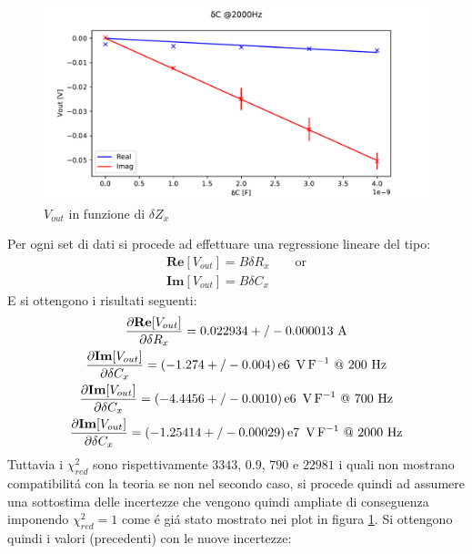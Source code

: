 \begin{figure}[h]
\begin{minipage}{0.5\textwidth}
    \end{minipage}\hfill
    \begin{minipage}{0.5\textwidth}
        \centering
        \includegraphics[width=\textwidth]{Figure_11.pdf} 
    \end{minipage}
    \caption{$V_{out}$ in funzione di $\delta Z_x$}
    \label{fig:deltaz}
\end{figure}
Per ogni set di dati si procede ad effettuare una regressione lineare del tipo:
\begin{gather}
	\mathbf{Re}[V_{out}]=B \delta R_x \qquad \text{or}\\
	\mathbf{Im}[V_{out}]=B \delta C_x
\end{gather}
E si ottengono i risultati seguenti:
\begin{gather}
	\frac{\partial \mathbf{Re}[V_{out}]}{\partial \delta R_x} = 0.022934+/-0.000013 \ \si{\ampere} \\
	\frac{\partial \mathbf{Im}[V_{out}]}{\partial \delta C_x} = (-1.274+/-0.004)\E{6} \ \si{\volt\per\farad} \ @ \  200 \ \si{\hertz}\\
	\frac{\partial \mathbf{Im}[V_{out}]}{\partial \delta C_x} = (-4.4456+/-0.0010)\E{6} \ \si{\volt\per\farad} \ @ \  700 \ \si{\hertz}\\
	\frac{\partial \mathbf{Im}[V_{out}]}{\partial \delta C_x} = (-1.25414+/-0.00029)\E{7} \ \si{\volt\per\farad} \ @ \  2000 \ \si{\hertz}
\end{gather}
Tuttavia i $\chi^2_{red}$ sono rispettivamente $3343$, $0.9$, $790$ e $22981$ i quali non mostrano compatibilit\'a con la teoria se non nel secondo caso, si procede quindi ad assumere una sottostima delle incertezze che vengono quindi ampliate di conseguenza imponendo $\chi^2_{red}=1$ come \'e gi\'a stato mostrato nei plot in figura \ref{fig:deltaz}. Si ottengono quindi i valori (precedenti) con le nuove incertezze:
